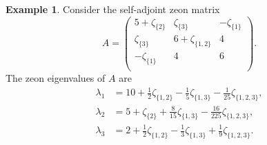\documentclass{article}
\theoremstyle{definition}
\newtheorem{example}[theorem]{Example}
\numberwithin{equation}{section}
\begin{document}
\begin{example}\label{spectral decomp example}
Consider the self-adjoint zeon matrix
\begin{equation*}
A=\left(
\begin{array}{ccc}
 5+\zeta _{\{2\}} & \zeta _{\{3\}} & -\zeta _{\{1\}} \\
 \zeta _{\{3\}} & 6+\zeta _{\{1,2\}} & 4 \\
 -\zeta _{\{1\}} & 4 & 6 \\
\end{array}
\right).
\end{equation*}
The zeon eigenvalues of $A$ are \begin{align*}
\lambda_1&=10+\frac{1}{2} \zeta _{\{1,2\}}-\frac{1}{5} \zeta _{\{1,3\}}-\frac{1}{25} \zeta _{\{1,2,3\}},\\
\lambda_2&=5+\zeta _{\{2\}}+\frac{8}{15} \zeta _{\{1,3\}}-\frac{16}{225} \zeta _{\{1,2,3\}},\\
\lambda_3&=2+\frac{1}{2} \zeta _{\{1,2\}}-\frac{1}{3} \zeta _{\{1,3\}}+\frac{1}{9} \zeta _{\{1,2,3\}}.
\end{align*}


\end{example}
\end{document}
